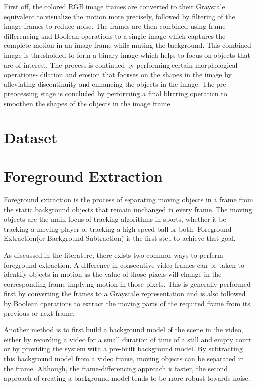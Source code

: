 \documentclass[a4paper]{article}
\begin{document}
First off, the colored RGB image frames are converted to their Grayscale equivalent to visualize the motion more precisely, followed by filtering of the image frames to reduce noise. The frames are then combined using frame differencing and Boolean operations to a single image which captures the complete motion in an image frame while muting the background. This combined image is thresholded to form a binary image which helps to focus on objects that are of interest. The process is continued by performing certain morphological operations- dilation and erosion that focuses on the shapes in the image by alleviating discontinuity and enhancing the objects in the image. The pre-preocessing stage is concluded by performing a final blurring operation to smoothen the shapes of the objects in the image frame.\par
\newpage


\section{Dataset}


\newpage



\section{Foreground Extraction}
Foreground extraction is the process of separating moving objects in a frame from the static background objects that remain unchanged in every frame. The moving objects are the main focus of tracking algorithms in sports, whether it be tracking a moving player or tracking a high-speed ball or both. Foreground Extraction(or Background Subtraction) is the first step to achieve that goal. \par
As discussed in the literature, there exists two common ways to perform foreground extraction. A difference in consecutive video frames can be taken to identify objects in motion as the value of those pixels will change in the corresponding frame implying motion in those pixels. This is generally performed first by converting the frames to a Grayscale representation and is also followed by Boolean operations to extract the moving parts of the required frame from its previous or next frame.\par
Another method is to first build a background model of the scene in the video, either by recording a video for a small duration of time of a still and empty court or by providing the system with a pre-built background model. By subtracting this background model from a video frame, moving objects can be separated in the frame. Although, the frame-differencing approach is faster, the second approach of creating a background model tends to be more robust towards noise. \par 
\end{document}
